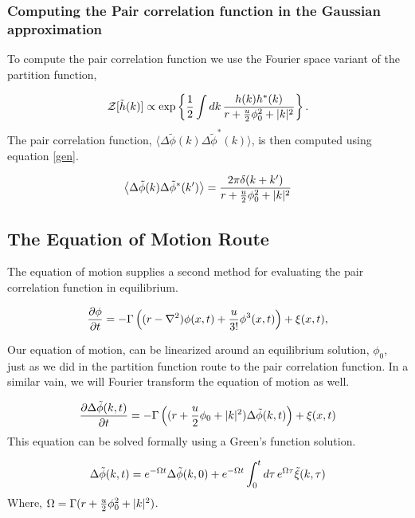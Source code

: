 \subsubsection{Computing the Pair correlation function in the Gaussian approximation}

To compute the pair correlation function we use the Fourier space variant of the partition function,

\begin{equation}
\mathcal{Z}[\tilde{h}(k)] \propto \exp\left\lbrace \frac{1}{2}\int dk\,\frac{h(k)h^{*}(k)}{r + \frac{u}{2}\phi_0^2 +  \vert k \vert^2}\right\rbrace.
\end{equation}
The pair correlation function, $\langle \Delta\tilde{\phi}(k)\Delta\tilde{\phi}^{*}(k)\rangle$, is then computed using equation \ref{gen}.

\begin{equation}
\left\langle \Delta\tilde{\phi}(k)\Delta\tilde{\phi}^{*}(k^\prime) \right\rangle = \frac{2\pi \delta(k+k^\prime)}{r + \frac{u}{2}\phi_0^2 + \vert k \vert^2}
\end{equation}

\subsection{The Equation of Motion Route}

The equation of motion supplies a second method for evaluating the pair correlation function in equilibrium.

\begin{equation}
\frac{\partial \phi}{\partial t} = -\Gamma\left((r-\nabla^2)\phi(x,t) + \frac{u}{3!}\phi^3(x,t)\right) + \xi(x, t),
\end{equation}

Our equation of motion, can be linearized around an equilibrium solution, $\phi_0$, just as we did in the partition function route to the pair correlation function. In a similar vain, we will Fourier transform the equation of motion as well.

\begin{equation}
\frac{\partial \Delta\tilde{\phi}(k, t)}{\partial t} = -\Gamma\left((r + \frac{u}{2}\phi_0 + \vert k \vert^2)\Delta\tilde{\phi}(k,t)\right) + \xi(x,t)
\end{equation}
This equation can be solved formally using a Green's function solution.

\begin{equation}
\Delta\tilde{\phi}(k, t) = e^{-\Omega t}\Delta\tilde{\phi}(k, 0) + e^{-\Omega t}\int_0^t d\tau \,e^{\Omega \tau} \tilde{\xi}(k, \tau)
\end{equation}
Where, $\Omega = \Gamma (r + \frac{u}{2}\phi_0^2 + \vert k \vert^2)$.

